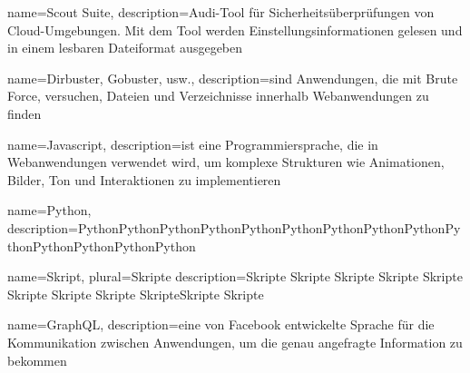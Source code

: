  {
    name={Scout Suite},
    description={Audi-Tool für Sicherheitsüberprüfungen von Cloud-Umgebungen. Mit dem Tool werden Einstellungsinformationen gelesen und in einem lesbaren Dateiformat ausgegeben \citep{scoutsuite}}   
}

 {
    name={Dirbuster, Gobuster, usw.},
    description={sind Anwendungen, die mit Brute Force, versuchen, Dateien und Verzeichnisse innerhalb Webanwendungen zu finden \citep{kalitools}}   
}

 {
    name={Javascript},
    description={ist eine Programmiersprache, die in Webanwendungen verwendet wird, um komplexe Strukturen wie Animationen, Bilder, Ton und Interaktionen zu implementieren \citep{javascriptdefinition}}   
}

 {
    name={Python},
    description={PythonPythonPythonPythonPythonPythonPythonPythonPythonPythonPythonPythonPythonPython \citep{javascriptdefinition}}   
}

 {
    name={Skript},
    plural={Skripte}
    description={Skripte Skripte Skripte Skripte Skripte Skripte Skripte Skripte SkripteSkripte Skripte \citep{javascriptdefinition}}   
}

 {
    name={GraphQL},
    description={eine von Facebook entwickelte Sprache für die Kommunikation zwischen Anwendungen, um die genau angefragte Information zu bekommen \citep{GraphQL}}   
}





